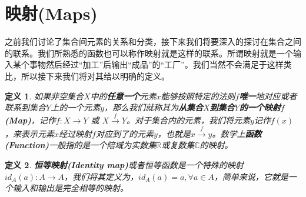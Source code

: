 \documentclass[mathserif,hyperref,UTF8,openany,b5paper]{ctexbook}
\newtheorem{defn}{定义}[section]
\begin{document}
\section{映射(Maps)}
之前我们讨论了集合间元素的关系和分类，接下来我们将要深入的探讨在集合之间的联系。我们所熟悉的函数也可以称作映射就是这样的联系。所谓映射就是一个输入某个事物然后经过“加工”后输出“成品”的“工厂”。我们当然不会满足于这样类比，所以接下来我们将对其给以明确的定义。
\begin{defn}
如果非空集合$X$中的\textbf{任意一个}元素$x$能够按照特定的法则$f$\textbf{唯一}地对应或者联系到集合$Y$上的一个元素$y$，那么我们就称其为\textbf{从集合$X$到集合$Y$的一个映射$f$ (Map)}，记作$f:X\xrightarrow{}Y$ 或 $X\xrightarrow{f}Y$。对于集合内的元素，我们将元素$y$记作$f(x)$，来表示元素$x$经过映射$f$对应到了的元素$y$，也就是$x\xrightarrow{f}y$。数学上\textbf{函数(Function)}一般指的是一个陪域为实数集$\mathbb{R}$或复数集$\mathbb{C}$的映射。
\end{defn}
\begin{defn}
\textbf{恒等映射(Identity map)}或者恒等函数是一个特殊的映射$id_A (a):A\xrightarrow{}A$，我们将其定义为，$id_A (a)=a, \forall a \in A$，简单来说，它就是一个输入和输出是完全相等的映射。
\end{defn}
\end{document}

